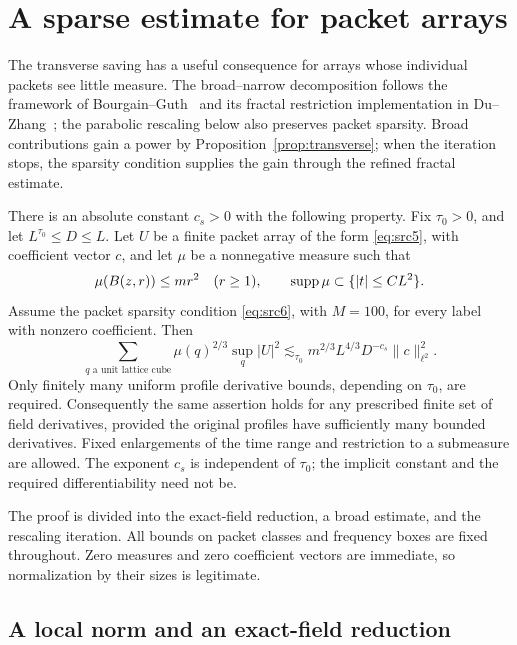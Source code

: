 \section{A sparse estimate for packet arrays}
\label{sec:sparse}

The transverse saving has a useful consequence for arrays whose individual
packets see little measure. The broad--narrow decomposition follows the
framework of Bourgain--Guth~\cite[Section~2]{BG11} and its fractal
restriction implementation in Du--Zhang~\cite[Section~3]{DZ19}; the
parabolic rescaling below also preserves packet sparsity. Broad
contributions gain a power by
Proposition~\ref{prop:transverse}; when the iteration stops, the sparsity
condition supplies the gain through the refined fractal estimate.

\begin{proposition}\label{prop:sparse}
There is an absolute constant $c_s>0$ with the following property.  Fix
$\tau_0>0$, and let $L^{\tau_0}\le D\le L$.  Let $U$ be a finite packet
array of the form \eqref{eq:src5}, with coefficient vector $c$, and let
$\mu$ be a nonnegative measure such that
\[
 \mu(B(z,r))\le m r^2\quad(r\ge1),\qquad
 \operatorname{supp}\mu\subset\{|t|\le C L^2\}.
\]
Assume the packet sparsity condition \eqref{eq:src6}, with $M=100$, for
every label with nonzero coefficient.  Then
\begin{equation}\label{eq:src7}
 \sum_{q\text{ a unit lattice cube}}
       \mu(q)^{2/3}\sup_q|U|^2
 \lesssim_{\tau_0}
       m^{2/3}L^{4/3}D^{-c_s}\|c\|_{\ell^2}^2.
\end{equation}
Only finitely many uniform profile derivative bounds, depending on
$\tau_0$, are required.  Consequently the same assertion holds for any
prescribed finite set of field derivatives, provided the original
profiles have sufficiently many bounded derivatives.  Fixed enlargements
of the time range and restriction to a submeasure are allowed.  The
exponent $c_s$ is independent of $\tau_0$; the implicit constant and the
required differentiability need not be.
\end{proposition}

The proof is divided into the exact-field reduction, a broad estimate, and
the rescaling iteration.  All bounds on packet classes and frequency
boxes are fixed throughout.  Zero measures and zero coefficient vectors
are immediate, so normalization by their sizes is legitimate.

\subsection{A local norm and an exact-field reduction}

